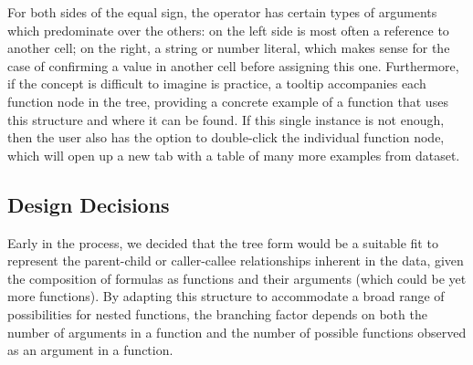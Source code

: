 \documentclass[conference]{IEEEtran}
\begin{document}
	For both sides of the equal sign, the operator has certain types of arguments
	which predominate over the others: on the left side is most often a reference
	to another cell; on the right, a string or number literal, which makes sense
	for the case of confirming a value in another cell before assigning this one.
	Furthermore, if the concept is difficult to imagine is practice, a tooltip
	accompanies each function node in the tree, providing a concrete example of a
	function that uses this structure and where it can be found. If this single
	instance is not enough, then the user also has the option to double-click the
	individual function node, which will open up a new tab with a table of many
	more examples from dataset.
	
	\subsection{Design Decisions} \label{ssec:decisions}
	Early in the process, we decided that the tree
	form would be a suitable fit to represent the parent-child or caller-callee
	relationships inherent in the data, given the composition of formulas as
	functions and their arguments (which could be yet more functions). By adapting
	this structure to accommodate a broad range of possibilities for nested
	functions, the branching factor depends on both the number of arguments in a
	function and the number of possible functions observed as an argument in a
	function. \par
	
\end{document}
